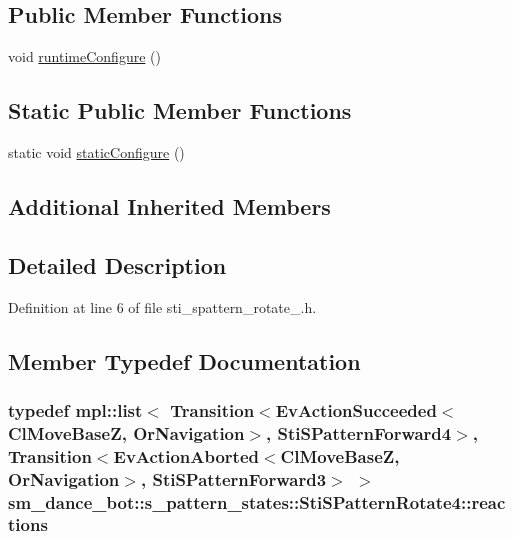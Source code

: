 \subsection*{Public Member Functions}
\begin{DoxyCompactItemize}
\item 
void \hyperlink{structsm__dance__bot_1_1s__pattern__states_1_1StiSPatternRotate4_a157355f75ecc6feaaefd500f5270e37a}{runtime\+Configure} ()
\end{DoxyCompactItemize}
\subsection*{Static Public Member Functions}
\begin{DoxyCompactItemize}
\item 
static void \hyperlink{structsm__dance__bot_1_1s__pattern__states_1_1StiSPatternRotate4_a69676062c0ba25893327648d72147b21}{static\+Configure} ()
\end{DoxyCompactItemize}
\subsection*{Additional Inherited Members}


\subsection{Detailed Description}


Definition at line 6 of file sti\+\_\+spattern\+\_\+rotate\+\_.\+h.



\subsection{Member Typedef Documentation}
\subsubsection[{\texorpdfstring{reactions}{reactions}}]{\setlength{\rightskip}{0pt plus 5cm}typedef mpl\+::list$<$ Transition$<$Ev\+Action\+Succeeded$<${\bf Cl\+Move\+BaseZ}, {\bf Or\+Navigation}$>$, {\bf Sti\+S\+Pattern\+Forward4}$>$, Transition$<$Ev\+Action\+Aborted$<${\bf Cl\+Move\+BaseZ}, {\bf Or\+Navigation}$>$, {\bf Sti\+S\+Pattern\+Forward3}$>$ $>$ {\bf sm\+\_\+dance\+\_\+bot\+::s\+\_\+pattern\+\_\+states\+::\+Sti\+S\+Pattern\+Rotate4\+::reactions}}\hypertarget{structsm__dance__bot_1_1s__pattern__states_1_1StiSPatternRotate4_a79688efd233c787e1328cd13a5fd0166}{}\label{structsm__dance__bot_1_1s__pattern__states_1_1StiSPatternRotate4_a79688efd233c787e1328cd13a5fd0166}


